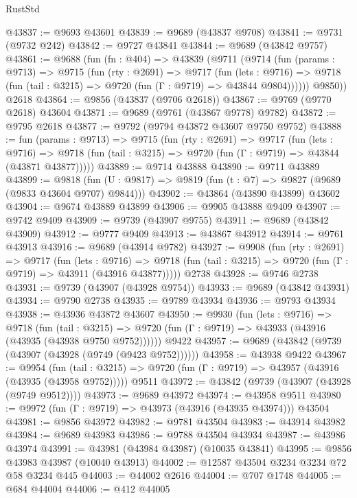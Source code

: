 \begin{lexlean}{RustStd}
\begin{coremodule}
@43837 := @9693 @43601
@43839 := @9689 (@43837 @9708)
@43841 := @9731 (@9732 @242)
@43842 := @9727 @43841
@43844 := @9689 (@43842 @9757)
@43861 := @9688
    (fun (fn : @404) =>
    @43839
      (@9711
        (@9714
          (fun (params : @9713) =>
          @9715
            (fun (rty : @2691) =>
            @9717
              (fun (lets : @9716) =>
              @9718 (fun (tail : @3215) => @9720 (fun (Γ : @9719) => @43844 @9804))))))
        @9850))
    @2618
@43864 := @9856 (@43837 (@9706 @2618))
@43867 := @9769 (@9770 @2618) @43604
@43871 := @9689 (@9761 (@43867 @9778) @9782)
@43872 := @9795 @2618
@43877 := @9792 (@9794 @43872 @43607 @9750 @9752)
@43888 := fun (params : @9713) =>
  @9715
    (fun (rty : @2691) =>
    @9717
      (fun (lets : @9716) =>
      @9718 (fun (tail : @3215) => @9720 (fun (Γ : @9719) => @43844 (@43871 @43877)))))
@43889 := @9714 @43888
@43890 := @9711 @43889
@43899 := @9818
    (fun (U : @9817) => @9819 (fun (t : @7) => @9827 (@9689 (@9833 @43604 @9707) @9844)))
@43902 := @43864 (@43890 @43899) @43602
@43904 := @9674 @43889 @43899
@43906 := @9905 @43888 @9409
@43907 := @9742 @9409
@43909 := @9739 (@43907 @9755)
@43911 := @9689 (@43842 @43909)
@43912 := @9777 @9409
@43913 := @43867 @43912
@43914 := @9761 @43913
@43916 := @9689 (@43914 @9782)
@43927 := @9908
    (fun (rty : @2691) =>
    @9717
      (fun (lets : @9716) =>
      @9718 (fun (tail : @3215) => @9720 (fun (Γ : @9719) => @43911 (@43916 @43877)))))
    @2738
@43928 := @9746 @2738
@43931 := @9739 (@43907 (@43928 @9754))
@43933 := @9689 (@43842 @43931)
@43934 := @9790 @2738
@43935 := @9789 @43934
@43936 := @9793 @43934
@43938 := @43936 @43872 @43607
@43950 := @9930
    (fun (lets : @9716) =>
    @9718
      (fun (tail : @3215) =>
      @9720 (fun (Γ : @9719) => @43933 (@43916 (@43935 (@43938 @9750 @9752))))))
    @9422
@43957 := @9689 (@43842 (@9739 (@43907 (@43928 (@9749 (@9423 @9752))))))
@43958 := @43938 @9422
@43967 := @9954
    (fun (tail : @3215) => @9720 (fun (Γ : @9719) => @43957 (@43916 (@43935 (@43958 @9752)))))
    @9511
@43972 := @43842 (@9739 (@43907 (@43928 (@9749 @9512))))
@43973 := @9689 @43972
@43974 := @43958 @9511
@43980 := @9972 (fun (Γ : @9719) => @43973 (@43916 (@43935 @43974))) @43504
@43981 := @9856 @43972
@43982 := @9781 @43504
@43983 := @43914 @43982
@43984 := @9689 @43983
@43986 := @9788 @43504 @43934
@43987 := @43986 @43974
@43991 := @43981 (@43984 @43987) (@10035 @43841)
@43995 := @9856 @43983 @43987 (@10040 @43913)
@44002 := @12587 @43504 @3234 @3234 @72 @58 @3234 @445
@44003 := @44002 @2616
@44004 := @707 @1748
@44005 := @684 @44004
@44006 := @412 @44005

\end{coremodule}
\end{lexlean}
